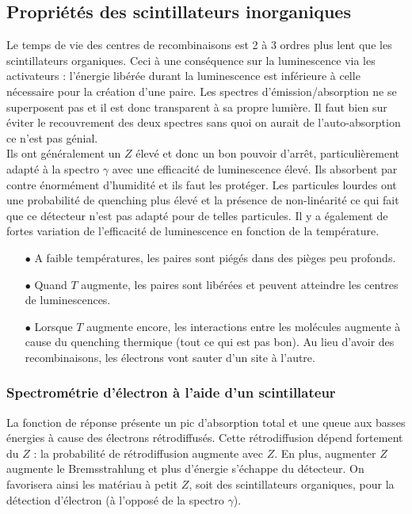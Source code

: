 \subsection{Propriétés des scintillateurs inorganiques}%
Le temps de vie des centres de recombinaisons est 2 à 3 ordres plus lent que les scintillateurs
organiques. Ceci à une conséquence sur la luminescence via les activateurs : l'énergie libérée
durant la luminescence est inférieure à celle nécessaire pour la création d'une paire. Les 
spectres d'émission/absorption ne se superposent pas et il est donc transparent à sa propre 
lumière. Il faut bien sur éviter le recouvrement des deux spectres sans quoi on aurait de 
l'auto-absorption ce n'est pas génial.\\

Ils ont généralement un $Z$ élevé et donc un bon pouvoir d'arrêt, particulièrement adapté à 
la spectro $\gamma$ avec une efficacité de luminescence élevé. Ils absorbent par contre 
énormément d'humidité et ils faut les protéger. Les particules lourdes ont une probabilité de
quenching plus élevé et la présence de non-linéarité ce qui fait que ce détecteur n'est pas
adapté pour de telles particules. Il y a également de fortes variation de l'efficacité de 
luminescence en fonction de la température.
\begin{itemize}
\item[$\bullet$] A faible températures, les paires sont piégés dans des pièges peu profonds.
\item[$\bullet$] Quand $T$ augmente, les paires sont libérées et peuvent atteindre les centres
de luminescences.
\item[$\bullet$] Lorsque $T$ augmente encore, les interactions entre les molécules augmente à
cause du quenching thermique (tout ce qui est pas bon). Au lieu d'avoir des recombinaisons, 
les électrons vont sauter d'un site à l'autre.
\end{itemize}

\subsubsection{Spectrométrie d'électron à l'aide d'un scintillateur}
La fonction de réponse présente un pic d'absorption total et une queue aux basses énergies à 
cause des électrons rétrodiffusés. Cette rétrodiffusion dépend fortement du $Z$ : la probabilité
de rétrodiffusion augmente avec $Z$. En plus, augmenter $Z$ augmente le Bremsstrahlung et plus
d'énergie s'échappe du détecteur. On favorisera ainsi les matériau à petit $Z$, soit des 
scintillateurs organiques, pour la détection d'électron (à l'opposé de la spectro $\gamma$).


